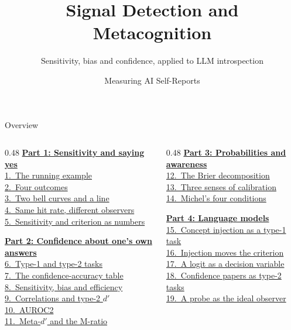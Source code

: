\documentclass[aspectratio=169,11pt]{beamer}
\title{Signal Detection and Metacognition}
\subtitle{Sensitivity, bias and confidence, applied to LLM introspection}
\author{Measuring AI Self-Reports}
\date{}
\institute{}
\begin{document}
\maketitle

\begin{frame}{Overview}\footnotesize
\begin{columns}[T]
\begin{column}{0.48\textwidth}
\hyperlink{part1}{\textbf{Part 1: Sensitivity and saying yes}}\\[0.15em]
{\scriptsize%
\quad\hyperlink{running}{1.~The running example}\\%
\quad\hyperlink{fourout}{2.~Four outcomes}\\%
\quad\hyperlink{curves}{3.~Two bell curves and a line}\\%
\quad\hyperlink{samehit}{4.~Same hit rate, different observers}\\%
\quad\hyperlink{formulas}{5.~Sensitivity and criterion as numbers}%
}\vspace{0.15em}

\hyperlink{part2}{\textbf{Part 2: Confidence about one's own answers}}\\[0.15em]
{\scriptsize%
\quad\hyperlink{types}{6.~Type-1 and type-2 tasks}\\%
\quad\hyperlink{table2}{7.~The confidence-accuracy table}\\%
\quad\hyperlink{three}{8.~Sensitivity, bias and efficiency}\\%
\quad\hyperlink{fail}{9.~Correlations and type-2 $d'$}\\%
\quad\hyperlink{auroc}{10.~AUROC2}\\%
\quad\hyperlink{metad}{11.~Meta-$d'$ and the M-ratio}%
}
\end{column}
\begin{column}{0.48\textwidth}
\hyperlink{part3}{\textbf{Part 3: Probabilities and awareness}}\\[0.15em]
{\scriptsize%
\quad\hyperlink{brier}{12.~The Brier decomposition}\\%
\quad\hyperlink{calsenses}{13.~Three senses of calibration}\\%
\quad\hyperlink{michel}{14.~Michel's four conditions}%
}\vspace{0.15em}

\hyperlink{part4}{\textbf{Part 4: Language models}}\\[0.15em]
{\scriptsize%
\quad\hyperlink{injection}{15.~Concept injection as a type-1 task}\\%
\quad\hyperlink{hahami}{16.~Injection moves the criterion}\\%
\quad\hyperlink{logit}{17.~A logit as a decision variable}\\%
\quad\hyperlink{conftasks}{18.~Confidence papers as type-2 tasks}\\%
\quad\hyperlink{probe}{19.~A probe as the ideal observer}%
}\vspace{0.15em}


\end{column}
\end{columns}
\end{frame}
\end{document}
